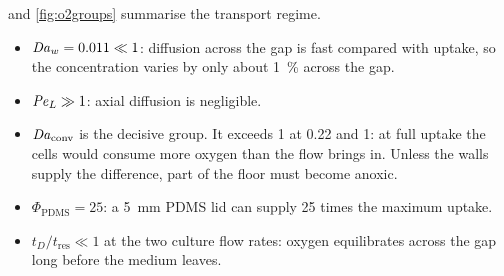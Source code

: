 \begin{table}[htbp]
\centering
\caption{Dimensionless groups and time scales of oxygen transport (baseline parameters; $\bar U_0=Q/(w_1h)$ at the inlet of the hyperbola; $A_{\mathrm{cells}}=\SI{115.13}{mm^2}$) \tagM.}
\label{tab:o2groups}
\small
{}
\end{table}

 and \cref{fig:o2groups} summarise the transport regime.
\begin{itemize}
\item $\mathit{Da}_w=0.011\ll1$: diffusion across the gap is fast compared with uptake, so the concentration varies by only about \SI{1}{\percent} across the gap.
\item $\mathit{Pe}_L\gg1$: axial diffusion is negligible.
\item $\mathit{Da}_{\mathrm{conv}}$ is the decisive group. It exceeds 1 at 0.22 and \SI{1}{\uLmin}: at full uptake the cells would consume more oxygen than the flow brings in. Unless the walls supply the difference, part of the floor must become anoxic.
\item $\Phi_{\mathrm{PDMS}}=25$: a \SI{5}{mm} PDMS lid can supply 25 times the maximum uptake.
\item $t_D/t_{\mathrm{res}}\ll1$ at the two culture flow rates: oxygen equilibrates across the gap long before the medium leaves.
\end{itemize}

